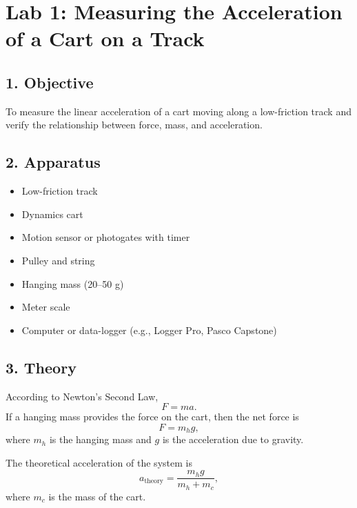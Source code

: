 \section*{Lab 1: Measuring the Acceleration of a Cart on a Track}

\subsection*{1. Objective}
To measure the linear acceleration of a cart moving along a low-friction track and verify the relationship between force, mass, and acceleration.

\subsection*{2. Apparatus}
\begin{itemize}
    \item Low-friction track
    \item Dynamics cart
    \item Motion sensor or photogates with timer
    \item Pulley and string
    \item Hanging mass (20--50 g)
    \item Meter scale
    \item Computer or data-logger (e.g., Logger Pro, Pasco Capstone)
\end{itemize}

\subsection*{3. Theory}
According to Newton's Second Law,
\[
F = ma.
\]
If a hanging mass provides the force on the cart, then the net force is
\[
F = m_h g,
\]
where \(m_h\) is the hanging mass and \(g\) is the acceleration due to gravity.

The theoretical acceleration of the system is
\[
a_{\text{theory}} = \frac{m_h g}{m_h + m_c},
\]
where \(m_c\) is the mass of the cart.

